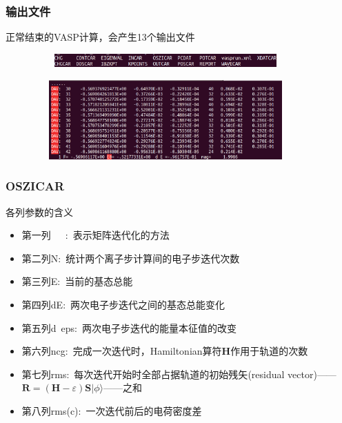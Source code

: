 {
	\frametitle{输出文件}
正常结束的\textrm{VASP}计算，会产生13个输出文件%
\begin{figure}[h!]
\centering
\vskip -2pt
\includegraphics[height=0.20in,width=4.0in,viewport=0 2 750 38,clip]{Figures/Pt_atom-lsout.png}
\caption{\fontsize{6.2pt}{5.2pt}}%
\label{Pt_atom:lsout}
\end{figure}

{\fontsize{7.5pt}{5.2pt}}%
\begin{figure}[h!]
\centering
\includegraphics[height=1.2in,width=4.0in,viewport=0 0 880 290,clip]{Figures/Pt_atom-OSZICAR.png}
\caption{\fontsize{6.2pt}{5.2pt}}%
\label{Pt_atom:OSZICAR}
\end{figure}
}

\frame
{
	\frametitle{\textrm{OSZICAR}}
	各列参数的含义
\begin{itemize}
	\item 第一列~~~:~表示矩阵迭代化的方法
	\item 第二列\textrm{N}:~统计两个离子步计算间的电子步迭代次数
	\item 第三列\textrm{E}:~当前的基态总能
	\item 第四列\textrm{dE}:~两次电子步迭代之间的基态总能变化
	\item 第五列\textrm{d~eps}:~两次电子步迭代的能量本征值的改变%
	\item 第六列\textrm{ncg}:~完成一次迭代时，\textrm{Hamiltonian}算符\textbf{H}作用于轨道的次数~
	\item 第七列\textrm{rms}:~每次迭代开始时全部占据轨道的初始残矢\textrm{(residual vector)}——$\mathbf{R}=(\mathbf{H}-\varepsilon)\mathbf{S}|\phi\rangle$——之和\\{\fontsize{7.0pt}{5.2pt}\selectfont{该值表明轨道的收敛情形的优劣}}
	\item 第八列\textrm{rms(c)}:~一次迭代前后的电荷密度差
\end{itemize}
}

